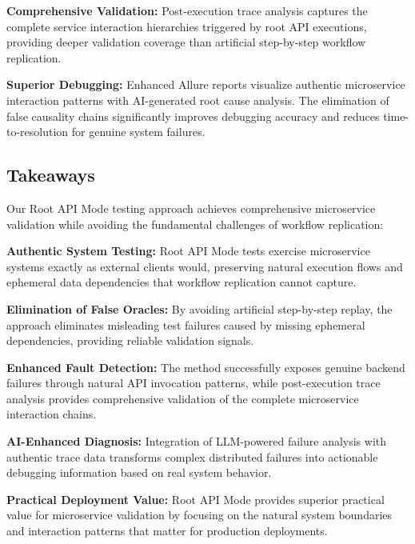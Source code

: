 \documentclass[conference]{IEEEtran}
\begin{document}
\textbf{Comprehensive Validation:} Post-execution trace analysis captures the complete service interaction hierarchies triggered by root API executions, providing deeper validation coverage than artificial step-by-step workflow replication.

\textbf{Superior Debugging:} Enhanced Allure reports visualize authentic microservice interaction patterns with AI-generated root cause analysis. The elimination of false causality chains significantly improves debugging accuracy and reduces time-to-resolution for genuine system failures.

\subsection{Takeaways}
Our Root API Mode testing approach achieves comprehensive microservice validation while avoiding the fundamental challenges of workflow replication:

\textbf{Authentic System Testing:} Root API Mode tests exercise microservice systems exactly as external clients would, preserving natural execution flows and ephemeral data dependencies that workflow replication cannot capture.

\textbf{Elimination of False Oracles:} By avoiding artificial step-by-step replay, the approach eliminates misleading test failures caused by missing ephemeral dependencies, providing reliable validation signals.

\textbf{Enhanced Fault Detection:} The method successfully exposes genuine backend failures through natural API invocation patterns, while post-execution trace analysis provides comprehensive validation of the complete microservice interaction chains.

\textbf{AI-Enhanced Diagnosis:} Integration of LLM-powered failure analysis with authentic trace data transforms complex distributed failures into actionable debugging information based on real system behavior.

\textbf{Practical Deployment Value:} Root API Mode provides superior practical value for microservice validation by focusing on the natural system boundaries and interaction patterns that matter for production deployments.



\end{document}
